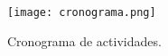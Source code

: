 \begin{figure}[H]
	\centering
	\texttt{[image: cronograma.png]}
	\caption{Cronograma de actividades.}
	\label{fig:cronograma}
\end{figure}
